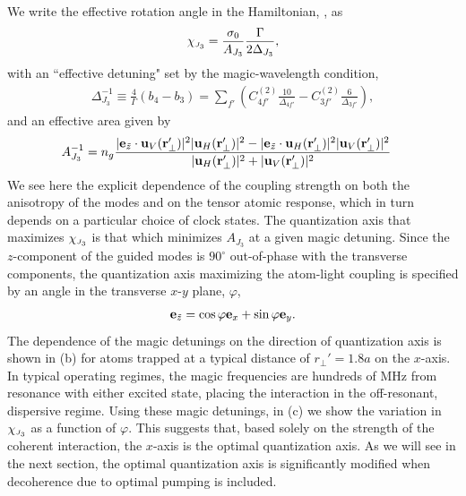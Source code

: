 \documentclass[preprint, aps,pra,onecolumn]{revtex4-1} %
\newcommand{\qaxis}{\mathbf{e}_{\tilde{z}}}
\newcommand{\chieff}{\chi_{\raisebox{-.1pt}{\tiny $J_3$}}}
\begin{document}
We write the effective rotation angle in the Hamiltonian, , as
	\begin{align} \label{Eq::chieff}
		\chieff = \frac{\sigma_0}{A_{J_3}} \frac{\Gamma}{ 2 \Delta_{J_3}},
	\end{align}
with an ``effective detuning" set by the magic-wavelength condition,
	\begin{align} \label{Eq::SqueezingEffectiveDetuning}
		 \Delta_{J_3}^{-1} \equiv \frac{4}{\Gamma} (b_4 - b_3) =   \sum_{f'}  \left( C^{(2)}_{4f'}\frac{10}{\Delta_{4f'}} -  C^{(2)}_{3f'}\frac{6}{ \Delta_{3f'} } \right),
	\end{align}
and an effective area given by
	\begin{align} \label{Eq::SqueezingModeArea}
		A_{J_3}^{-1} & = n_g \frac{ |\mathbf{e}_{\tilde{z}} \cdot \mathbf{u}_V(\mathbf{r}'_\perp)|^2 |\mathbf{u}_H(\mathbf{r}'_\perp)|^2 - |\mathbf{e}_{\tilde{z}} \cdot \mathbf{u}_H(\mathbf{r}'_\perp) |^2 |\mathbf{u}_V(\mathbf{r}'_\perp)|^2 }{ |\mathbf{u}_H(\mathbf{r}'_\perp)|^2 + |\mathbf{u}_V(\mathbf{r}'_\perp)|^2 } 
	\end{align}	
We see here the explicit dependence of the coupling strength on both the anisotropy of the modes and on the tensor atomic response, which in turn depends on a particular choice of clock states.  The quantization axis that maximizes $\chieff$ is that which minimizes $A_{J_3}$ at a given magic detuning.  
Since the $z$-component of the guided modes is $90^\circ$ out-of-phase with the transverse components, the quantization axis maximizing the atom-light coupling is specified by an angle in the transverse $x$-$y$ plane, $\varphi$,
	\begin{align} \label{Eq::QuantizationAxis}
		\qaxis = \cos \varphi \mbf{e}_x + \sin \varphi \mbf{e}_y.
	\end{align}
The dependence of the magic detunings on the direction of quantization axis is shown in (b) for atoms trapped at a typical distance of $r_\perp'=1.8a$ on the $x$-axis.   
In typical operating regimes, the magic frequencies are hundreds of MHz from resonance with either excited state, placing the interaction in the off-resonant, dispersive regime.  
Using these magic detunings, in (c) we show the variation in $\chieff$ as a function of $\varphi$.  
This suggests that, based solely on the strength of the coherent interaction, the $x$-axis is the optimal quantization axis. 
As we will see in the next section, the optimal quantization axis is significantly modified when decoherence due to optimal pumping is included.
\end{document}
